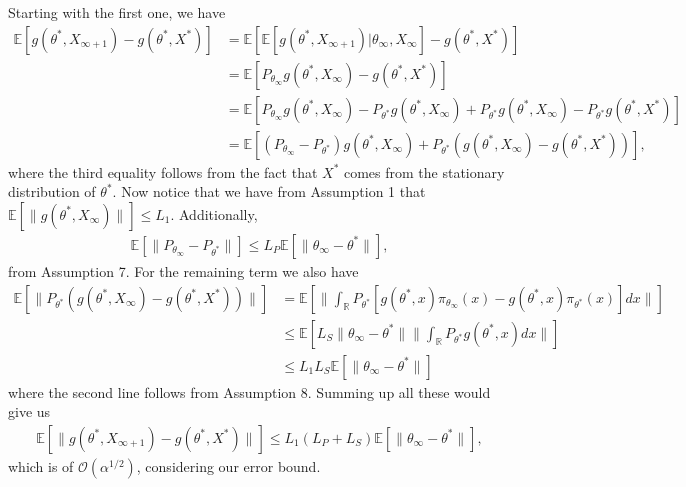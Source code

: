 \documentclass[a4paper]{article}
\newcommand{\norm}[1]{\|#1 \|}
\newcommand{\Exs}{\mathbb{E}}
\newcommand{\thetastar}{\theta^*}
\newcommand{\thetainf}{\theta_\infty}
\newcommand{\xstar}{X^*}
\newcommand{\xinf}{X_{\infty}}
\newcommand{\xinfPone}{X_{\infty + 1}}
\newcommand{\stepsize}{\alpha}
\begin{document}
	 Starting with the first one, we have 
	 \begin{align*}
	 	\Exs\left[g\left(\thetastar, \xinfPone\right) - g\left(\thetastar, \xstar\right)\right] &= \Exs\left[\Exs\left[g\left(\thetastar, \xinfPone\right) | \thetainf, \xinf\right] - g\left(\thetastar, \xstar\right)\right]\\
	 	&= \Exs\left[P_{\thetainf}g\left(\thetastar, \xinf\right) - g\left(\thetastar, \xstar\right)\right]\\
	 	&= \Exs\left[P_{\thetainf}g\left(\thetastar, \xinf\right) - P_{\thetastar}g\left(\thetastar, \xinf\right) + P_{\thetastar}g\left(\thetastar, \xinf\right) - P_{\thetastar}g\left(\thetastar, \xstar\right)\right]\\
	 	&= \Exs\left[\left(P_{\thetainf} - P_{\thetastar}\right)g\left(\thetastar, \xinf\right) + P_{\thetastar}\left(g\left(\thetastar, \xinf\right) - g\left(\thetastar, \xstar\right)\right)\right],
	 \end{align*}
	 where the third equality follows from the fact that $\xstar$ comes from the stationary distribution of $\thetastar$. Now notice that we have from Assumption 1 that $\Exs\left[\norm{g\left(\thetastar, \xinf\right)}\right] \leq L_{1}$. Additionally,
	 \begin{align*}
	 	\Exs\left[\norm{P_{\thetainf} - P_{\thetastar}}\right] \leq L_{P}\Exs\left[\norm{\thetainf - \thetastar}\right],
	 \end{align*}
	 from Assumption 7. For the remaining term we also have
	 \begin{align*}
	 	\Exs\left[\norm{P_{\thetastar}\left(g\left(\thetastar, \xinf\right) - g\left(\thetastar, \xstar\right)\right)}\right] &= \Exs\left[\norm{\int_{\mathbb{R}}P_{\thetastar}\left[g\left(\thetastar, x\right)\pi_{\thetainf}(x) - g\left(\thetastar, x\right)\pi_{\thetastar}(x)\right] dx}\right]\\
	 	& \leq \Exs\left[L_{S}\norm{\thetainf - \thetastar}\norm{\int_{\mathbb{R}}P_{\thetastar}g\left(\thetastar, x\right)dx}\right]\\
	 	& \leq L_{1}L_{S}\Exs\left[\norm{\thetainf - \thetastar}\right]
	 \end{align*}
	 where the second line follows from Assumption 8. Summing up all these would give us
	 \begin{align*}
	 	\Exs\left[\norm{g\left(\thetastar, \xinfPone\right) - g\left(\thetastar, \xstar\right)}\right] \leq L_{1}\left(L_{P} + L_{S}\right)\Exs\left[\norm{\thetainf - \thetastar}\right],
	 \end{align*}
	 which is of $\mathcal{O}(\stepsize^{1 / 2})$, considering our error bound.
	 
\end{document}
